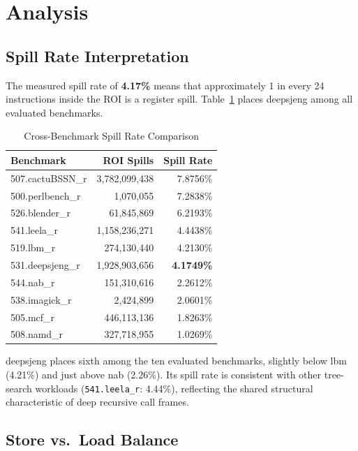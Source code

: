 \documentclass[conference]{IEEEtran}
\begin{document}
\section{Analysis}

\subsection{Spill Rate Interpretation}

The measured spill rate of \textbf{4.17\%} means that approximately
1 in every 24 instructions inside the ROI is a register spill.
Table~\ref{tab:compare} places deepsjeng among all evaluated benchmarks.

\begin{table}[H]
\centering
\caption{Cross-Benchmark Spill Rate Comparison}
\label{tab:compare}
\begin{tabular}{lrr}
\toprule
\textbf{Benchmark} & \textbf{ROI Spills} & \textbf{Spill Rate} \\
\midrule
507.cactuBSSN\_r & 3,782,099,438 & 7.8756\% \\
500.perlbench\_r &     1,070,055 & 7.2838\% \\
526.blender\_r   &    61,845,869 & 6.2193\% \\
541.leela\_r     & 1,158,236,271 & 4.4438\% \\
519.lbm\_r       &   274,130,440 & 4.2130\% \\
531.deepsjeng\_r & 1,928,903,656 & \textbf{4.1749\%} \\
544.nab\_r       &   151,310,616 & 2.2612\% \\
538.imagick\_r   &     2,424,899 & 2.0601\% \\
505.mcf\_r       &   446,113,136 & 1.8263\% \\
508.namd\_r      &     327,718,955 & 1.0269\% \\
\bottomrule
\end{tabular}
\end{table}

deepsjeng places sixth among the ten evaluated benchmarks, slightly
below lbm (4.21\%) and just above nab (2.26\%). Its spill rate is
consistent with other tree-search workloads (\texttt{541.leela\_r}:
4.44\%), reflecting the shared structural characteristic of deep
recursive call frames.

\subsection{Store vs.\ Load Balance}
\end{document}
